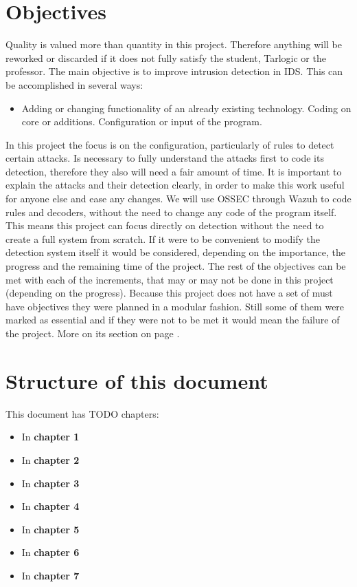 \section{Objectives}
Quality is valued more than quantity in this project. Therefore anything will be reworked or discarded if it does not fully satisfy the student, Tarlogic or the professor.
\linej
\linej
The main objective is to improve intrusion detection in IDS. This can be accomplished in several ways:
\begin{itemize}
	\item Adding or changing functionality of an already existing technology.
		\subitem Coding on core or additions.
		\subitem Configuration or input of the program.
\end{itemize}
\linej
In this project the focus is on the configuration, particularly of rules to detect certain attacks. Is necessary to fully understand the attacks first to code its detection, therefore they also will need a fair amount of time.
It is important to explain the attacks and their detection clearly, in order to make this work useful for anyone else and ease any changes.
\linej
\linej
We will use OSSEC through Wazuh to code rules and decoders, without the need to change any code of the program itself.
This means this project can focus directly on detection without the need to create a full system from scratch.
If it were to be convenient to modify the detection system itself it would be considered, depending on the importance, the progress and the remaining time of the project.
\linej
\linej
The rest of the objectives can be met with each of the increments, that may or may not be done in this project (depending on the progress).
Because this project does not have a set of must have objectives they were planned in a modular fashion. Still some of them were marked as essential and if they were not to be met it would mean the failure of the project. More on its section on page \pageref{increments}.

\section{Structure of this document}
This document has TODO chapters:
\begin{itemize}
	\item In \textbf{chapter 1} 
	\item In \textbf{chapter 2} 
	\item In \textbf{chapter 3} 
	\item In \textbf{chapter 4} 
	\item In \textbf{chapter 5} 
	\item In \textbf{chapter 6} 
	\item In \textbf{chapter 7} 
\end{itemize}

